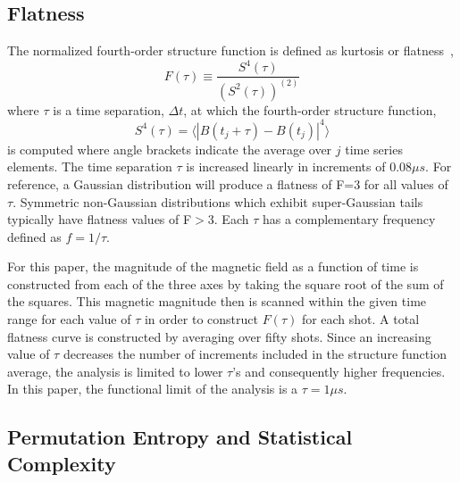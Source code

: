 \documentclass[aip,pop,amsmath,amssymb,preprint,superscriptaddress]{revtex4-1} %
\begin{document}
\subsection{Flatness}
The normalized fourth-order structure function is defined as kurtosis or flatness~\cite{schaffner2015},
\begin{equation}
F(\tau) \equiv \frac{S^{4}(\tau)}{{(S^2(\tau))^{(2)}}}
\label{eq:structfunc}
\end{equation}
where $\tau$ is a time separation, $\Delta t$, at which the fourth-order structure function,
\begin{equation}
S^{4}(\tau) = \langle|B(t_{j}+\tau)-B(t_{j})|^{4}\rangle
\label{eq:structfunc2}
\end{equation}
is computed where angle brackets indicate the average over $j$ time series elements. The time separation $\tau$ is increased linearly in increments of $0.08\mu s$. For reference, a Gaussian distribution will produce a flatness of F=3 for all values of $\tau$. Symmetric non-Gaussian distributions which exhibit super-Gaussian tails typically have flatness values of F$>$3. Each $\tau$ has a complementary frequency defined as $f = 1/\tau$.

For this paper, the magnitude of the magnetic field as a function of time is constructed from each of the three axes by taking the square root of the sum of the squares. This magnetic magnitude then is scanned within the given time range for each value of $\tau$ in order to construct $F(\tau)$ for each shot. A total flatness curve is constructed by averaging over fifty shots. Since an increasing value of $\tau$ decreases the number of increments included in the structure function average, the analysis is limited to lower $\tau$'s and consequently higher frequencies. In this paper, the functional limit of the analysis is a $\tau = 1\mu s$.

\subsection{Permutation Entropy and Statistical Complexity}
\end{document}
